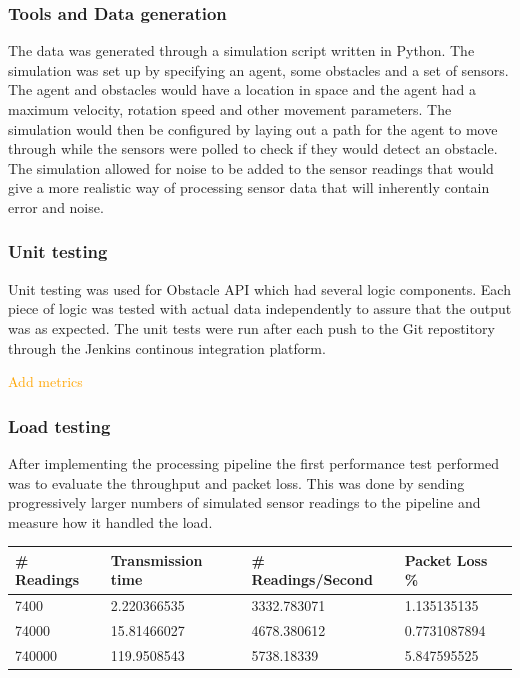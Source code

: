 \documentclass[prodmode,acmtosem]{acmsmall} %
\begin{document}
\subsubsection{Tools and Data generation}
The data was generated through a simulation script written in Python. The simulation was set up by specifying an agent, some obstacles and a set of sensors. The agent and obstacles would have a location in space and the agent had a maximum velocity, rotation speed and other movement parameters. The simulation would then be configured by laying out a path for the agent to move through while the sensors were polled to check if they would detect an obstacle. The simulation allowed for noise to be added to the sensor readings that would give a more realistic way of processing sensor data that will inherently contain error and noise.

\subsubsection{Unit testing}
Unit testing was used for Obstacle API which had several logic components. Each piece of logic was tested with actual data independently to assure that the output was as expected. The unit tests were run after each push to the Git repostitory through the Jenkins continous integration platform.

\textcolor{orange}{Add metrics}

\subsubsection{Load testing}
After implementing the processing pipeline the first performance test performed was to evaluate the throughput and packet loss. This was done by sending progressively larger numbers of simulated sensor readings to the pipeline and measure how it handled the load.

\begin{center}
\begin{tabularx}{\textwidth}{| X | X | X | X |} 
\hline
\# Readings & Transmission time & \# Readings/Second & Packet Loss \% \\
\hline
7400 & 2.220366535 & 3332.783071 & 1.135135135 \\
\hline
74000 & 15.81466027 & 4678.380612 & 0.7731087894 \\
\hline
740000 & 119.9508543 & 5738.18339 & 5.847595525 \\
\hline
\end{tabularx}
\label{tab:performance}
\end{center}
\end{document}
